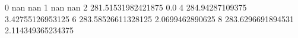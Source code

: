 0 nan nan
1 nan nan
2 281.51531982421875 0.0
4 284.94287109375 3.42755126953125
6 283.58526611328125 2.0699462890625
8 283.6296691894531 2.114349365234375
